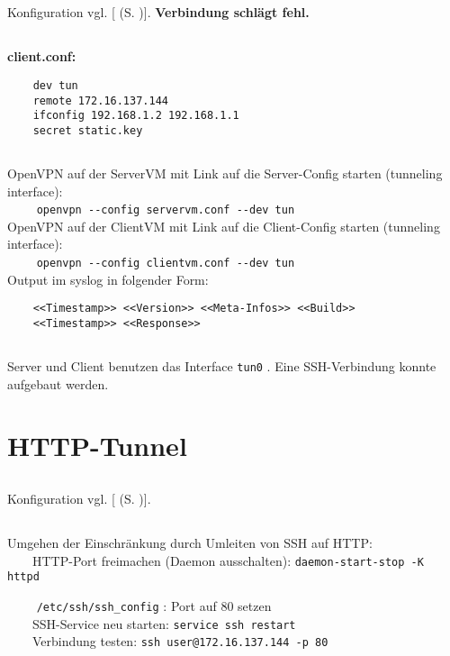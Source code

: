 \documentclass[twoside]{article}
\newcommand{\ttt}[1]{%
	\texttt{#1}%
}
\newcommand{\mref}[1]{[\nameref{#1} (S. \pageref{#1})]}
\begin{document}
	\subsection{}
	\label{ssec:5.3}
	Konfiguration vgl. \mref{a5-3}. \textbf{Verbindung schlägt fehl.}
	\subsection{}
	\label{ssec:5.4}
	\textbf{client.conf:}
	\begin{verbatim}
	dev tun
	remote 172.16.137.144
	ifconfig 192.168.1.2 192.168.1.1
	secret static.key
	\end{verbatim}
	\subsection{}
	\label{ssec:5.5}
	OpenVPN auf der ServerVM mit Link auf die Server-Config starten (tunneling interface):\\
	\-~~~~\ttt{openvpn {-}{-}config servervm.conf {-}{-}dev tun}\\
	OpenVPN auf der ClientVM mit Link auf die Client-Config starten (tunneling interface):\\
	\-~~~~\ttt{openvpn {-}{-}config clientvm.conf {-}{-}dev tun}\\
	Output im syslog in folgender Form:
	\begin{verbatim}
	<<Timestamp>> <<Version>> <<Meta-Infos>> <<Build>>
	<<Timestamp>> <<Response>>
	\end{verbatim}
	\subsection{}
	\label{ssec:5.6}
	Server und Client benutzen das Interface \ttt{tun0}.
	Eine SSH-Verbindung konnte aufgebaut werden.

\section{HTTP-Tunnel}
\label{sec:http-tunnel}
	\subsection{}
	\label{ssec:6.1}
	Konfiguration vgl. \mref{a6-1}.
	\subsection{}
	\label{ssec:6.2}
	Umgehen der Einschränkung durch Umleiten von SSH auf HTTP:\\
	\-~~~~HTTP-Port freimachen (Daemon ausschalten): \ttt{daemon-start-stop -K httpd}
	\-~~~~\ttt{/etc/ssh/ssh\_config}: Port auf 80 setzen\\
	\-~~~~SSH-Service neu starten: \ttt{service ssh restart}\\
	\-~~~~Verbindung testen: \ttt{ssh user@172.16.137.144 -p 80}
\end{document}

